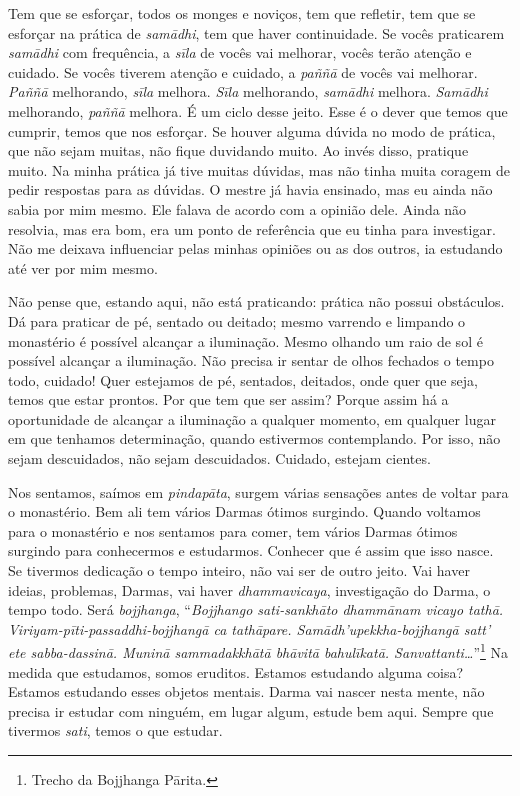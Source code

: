 Tem que se esforçar, todos os monges e noviços, tem que refletir,
tem que se esforçar na prática de \textit{samādhi}, tem que haver
continuidade. Se vocês praticarem \textit{samādhi} com frequência, a
\textit{sīla} de vocês vai melhorar, vocês terão atenção e cuidado.
Se vocês tiverem atenção e cuidado, a \textit{paññā} de vocês vai
melhorar. \textit{Paññā} melhorando, \textit{sīla} melhora.
\textit{Sīla} melhorando, \textit{samādhi} melhora.
\textit{Samādhi} melhorando, \textit{paññā} melhora. É um ciclo
desse jeito. Esse é o dever que temos que cumprir, temos que nos
esforçar. Se houver alguma dúvida no modo de prática, que não sejam
muitas, não fique duvidando muito. Ao invés disso, pratique muito. Na
minha prática já tive muitas dúvidas, mas não tinha muita coragem de
pedir respostas para as dúvidas. O mestre já havia ensinado, mas eu
ainda não sabia por mim mesmo. Ele falava de acordo com a opinião dele.
Ainda não resolvia, mas era bom, era um ponto de referência que eu
tinha para investigar. Não me deixava influenciar pelas minhas opiniões
ou as dos outros, ia estudando até ver por mim mesmo.

Não pense que, estando aqui, não está praticando: prática não possui
obstáculos. Dá para praticar de pé, sentado ou deitado; mesmo varrendo
e limpando o monastério é possível alcançar a iluminação. Mesmo olhando
um raio de sol é possível alcançar a iluminação. Não precisa ir sentar
de olhos fechados o tempo todo, cuidado! Quer estejamos de pé,
sentados, deitados, onde quer que seja, temos que estar prontos. Por
que tem que ser assim? Porque assim há a oportunidade de alcançar a
iluminação a qualquer momento, em qualquer lugar em que tenhamos
determinação, quando estivermos contemplando. Por isso, não sejam
descuidados, não sejam descuidados. Cuidado, estejam cientes. 

Nos sentamos, saímos em \textit{pindapāta}, surgem várias
sensações antes de voltar para o monastério. Bem ali tem vários Darmas
ótimos surgindo. Quando voltamos para o monastério e nos sentamos para
comer, tem vários Darmas ótimos surgindo para conhecermos e estudarmos.
Conhecer que é assim que isso nasce. Se tivermos dedicação o tempo
inteiro, não vai ser de outro jeito. Vai haver ideias, problemas,
Darmas, vai haver \textit{dhammavicaya}, investigação do Darma, o tempo
todo. Será \textit{bojjhanga}, “\textit{Bojjhango sati-sankhāto
dhammānam vicayo tathā. Viriyam-pīti-passaddhi-bojjhangā ca
tathāpare. Samādh’upekkha-bojjhangā satt’ ete sabba-dassinā.
Muninā sammadakkhātā bhāvitā bahulīkatā.
Sanvattanti…}”\footnote{Trecho da Bojjhanga Pārita.} Na medida que
estudamos, somos eruditos. Estamos estudando alguma coisa? Estamos
estudando esses objetos mentais. Darma vai nascer nesta mente, não
precisa ir estudar com ninguém, em lugar algum, estude bem aqui. Sempre
que tivermos \textit{sati}, temos o que estudar. 

